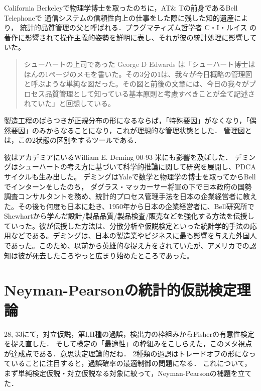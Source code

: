 \documentclass[uplatex,dvipdfmx]{jsreport}
\begin{document}
\begin{history}
    California Berkeleyで物理学博士を取ったのちに，AT\& Tの前身であるBell Telephoneで
    通信システムの信頼性向上の仕事をした際に残した知的遺産により，
    統計的品質管理の父と呼ばれる．プラグマティズム哲学者 C・I・ルイス の著作に影響されて操作主義的姿勢を鮮明に表し、それが彼の統計処理に影響していた。
    \begin{quote}
        シューハートの上司であった George D Edwards は「シューハート博士はほんの1ページのメモを書いた。その3分の1は、我々が今日概略の管理図と呼ぶような単純な図だった。その図と前後の文章には、今日の我々がプロセス品質管理として知っている基本原則と考慮すべきことが全て記述されていた」と回想している。
    \end{quote}
    製造工程のばらつきが正規分布の形になるならば，「特殊要因」がなくなり，「偶然要因」のみからなることになり，これが理想的な管理状態とした．
    管理図とは，この2状態の区別をするツールである．

    彼はアカデミアにいるWilliam E. Deming 00-93 米にも影響を及ぼした．
    デミングはシューハートの考え方に基づいて科学的推論に関して研究を展開し、PDCAサイクルも生み出した。 
    デミングはYaleで数学と物理学の博士を取ってからBellでインターンをしたのち，
    ダグラス・マッカーサー将軍の下で日本政府の国勢調査コンサルタントを務め、統計的プロセス管理手法を日本の企業経営者に教えた。その後も何度も日本に赴き、1950年から日本の企業経営者に、Bell研究所で
    Shewhartから学んだ設計/製品品質/製品検査/販売などを強化する方法を伝授していった。彼が伝授した方法は、分散分析や仮説検定といった統計学的手法の応用などである。デミングは、日本の製造業やビジネスに最も影響を与えた外国人であった。このため、以前から英雄的な捉え方をされていたが、アメリカでの認知は彼が死去したころやっと広まり始めたところであった。
\end{history}

\section{Neyman-Pearsonの統計的仮説検定理論}

\begin{tcolorbox}[colframe=ForestGreen, colback=ForestGreen!10!white,breakable,colbacktitle=ForestGreen!40!white,coltitle=black,fonttitle=\bfseries\sffamily,
title=]
    28, 33にて，対立仮説，第I,II種の過誤，検出力の枠組みからFisherの有意性検定を捉え直した．
    そして検定の「最適性」の枠組みをこしらえた，このメタ視点が達成点である．意思決定理論的だね．
    2種類の過誤はトレードオフの形になっていることに注目すると，過誤確率の最適制御の問題になる．
    これについて，まず単純検定仮説・対立仮説なる対象に絞って，Neyman-Pearsonの補題を立てた．
\end{tcolorbox}
\end{document}
